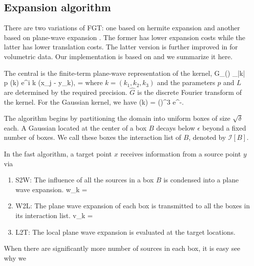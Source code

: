 \documentclass[conference]{IEEEtran}
\begin{document}
\subsection{Expansion algorithm}
There are two variations of FGT: one based on hermite expansion \cite{fgt} and another based on plane-wave expansion \cite{greengard98}. The former has lower expansion costs while the latter has lower translation costs. The latter version is further improved in \cite{fggt} for volumetric data. Our implementation is based on \cite{fggt} and we summarize it here. 

The central is the finite-term plane-wave representation of the kernel,
\beq G_\delta() \approx \sum_{|k| \leq p} (k) e^{i \lambda k \cdot (x_j - y_k)}, \quad \lambda = \eeq
where $k = (k_1, k_2, k_3)$ and the parameters $p$ and $L$ are determined by the required precision. $\hat{G}$ is the discrete Fourier transform of the kernel. For the Gaussian kernel, we have 
\beq {}(k) = \left(\right)^3 e^{-}.\eeq

The algorithm begins by partitioning the domain into uniform boxes of size $\sqrt{\delta}$ each. A Gaussian located at the center of a box $B$ decays below $\epsilon$ beyond a fixed number of boxes. We call these boxes the interaction list of $B$, denoted by $\mathcal{I}[B]$. 

In the fast algorithm, a target point $x$ receives information from a source point $y$ via 
\begin{enumerate}
\item{S2W:} The influence of all the sources in a box $B$ is condensed into a plane wave expansion.
            \beq w_k = \eeq
\item{W2L:} The plane wave expansion of each box is transmitted to all the boxes in its interaction list. 
            \beq v_k = \eeq
\item{L2T:} The local plane wave expansion is evaluated at the target locations. 
\end{enumerate} 

When there are significantly more number of sources in each box, it is easy see why we


%
\end{document}
